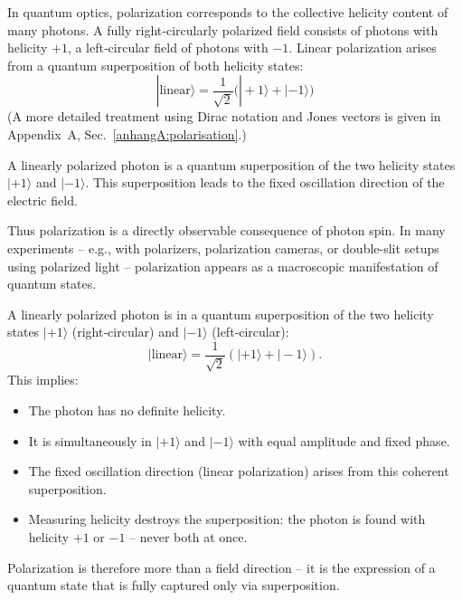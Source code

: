 \vspace{0.5em}
In quantum optics, polarization corresponds to the collective helicity content of many photons. A fully right‑circularly polarized field consists of photons with helicity $+1$, a left‑circular field of photons with $-1$. Linear polarization arises from a quantum superposition of both helicity states:
$$
|\text{linear}\rangle = \frac{1}{\sqrt{2}} \bigl( |+1\rangle + |-1\rangle \bigr)
$$
(A more detailed treatment using Dirac notation and Jones vectors is given in Appendix~A, Sec.~\ref{anhangA:polarisation}.)
\vspace{1em}
\begin{tcolorbox}[physikbox, title=Superposition and Polarization]
	\label{box:Superposition}
	A linearly polarized photon is a quantum superposition of the two helicity states $|+1\rangle$ and $|-1\rangle$. This superposition leads to the fixed oscillation direction of the electric field.
\end{tcolorbox}

\vspace{0.5em}
Thus polarization is a directly observable consequence of photon spin. In many experiments – e.g., with polarizers, polarization cameras, or double-slit setups using polarized light – polarization appears as a macroscopic manifestation of quantum states.
\vspace{1em}
\begin{tcolorbox}[physikbox, title=Superposition and Polarization]
	\label{box:Superposition und Polarisation}
	A linearly polarized photon is in a quantum superposition of the two helicity states $|+1\rangle$ (right‑circular) and $|-1\rangle$ (left‑circular):
	$$
	|\text{linear}\rangle = \frac{1}{\sqrt{2}} \left( |+1\rangle + |-1\rangle \right).
	$$
	This implies:
	\begin{itemize}
		\item The photon has no definite helicity.
		\item It is simultaneously in $|+1\rangle$ and $|-1\rangle$ with equal amplitude and fixed phase.
		\item The fixed oscillation direction (linear polarization) arises from this coherent superposition.
		\item Measuring helicity destroys the superposition: the photon is found with helicity $+1$ or $-1$ – never both at once.
	\end{itemize}
	Polarization is therefore more than a field direction – it is the expression of a quantum state that is fully captured only via superposition.
\end{tcolorbox}

